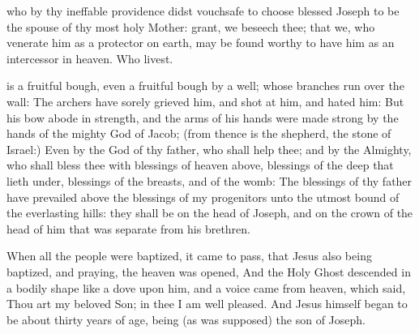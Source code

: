 \vspace{-0.1\baselineskip}

 who by thy ineffable providence didst vouchsafe to choose blessed Joseph to be the spouse of thy most holy Mother: grant, we beseech thee; that we, who venerate him as a protector on earth, may be found worthy to have him as an intercessor in heaven. Who livest.

\vspace{-0.15\baselineskip}


\vspace{-0.1\baselineskip}

 is a fruitful bough, even a fruitful bough by a well; whose branches run over the wall: The archers have sorely grieved him, and shot at him, and hated him: But his bow abode in strength, and the arms of his hands were made strong by the hands of the mighty God of Jacob; (from thence is the shepherd, the stone of Israel:) Even by the God of thy father, who shall help thee; and by the Almighty, who shall bless thee with blessings of heaven above, blessings of the deep that lieth under, blessings of the breasts, and of the womb: The blessings of thy father have prevailed above the blessings of my progenitors unto the utmost bound of the everlasting hills: they shall be on the head of Joseph, and on the crown of the head of him that was separate from his brethren.

\vspace{-0.15\baselineskip}


\vspace{-0.1\baselineskip}

 When all the people were baptized, it came to pass, that Jesus also being baptized, and praying, the heaven was opened, And the Holy Ghost descended in a bodily shape like a dove upon him, and a voice came from heaven, which said, Thou art my beloved Son; in thee I am well pleased. And Jesus himself began to be about thirty years of age, being (as was supposed) the son of Joseph.

